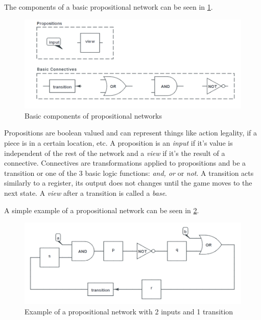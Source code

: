 The components of a basic propositional network can be seen in \ref{fig:propnets components}.

\begin{figure}[h]
	\centering
    \includegraphics[scale=0.45]{images/propnets_components.png}
    \caption{Basic components of propositional networks}
    \label{fig:propnets components}
\end{figure}

Propositions are boolean valued and can represent things like action legality, if a piece is in a certain location, etc. A proposition is an \textit{input} if it's value is independent of the rest of the network and a \textit{view} if it's the result of a connective.
Connectives are transformations applied to propositions and be a transition or one of the 3 basic logic functions: \textit{and, or} or \textit{not}. A transition acts similarly to a register, its output does not changes until the game moves to the next state. A \textit{view} after a transition is called a \textit{base}.

A simple example of a propositional network can be seen in \ref{fig:propnets example}.

\begin{figure}[h]
	\centering
    \includegraphics[scale=0.45]{images/propnets_example.png}
    \caption{Example of a propositional network with 2 inputs and 1 transition}
    \label{fig:propnets example}
\end{figure}


